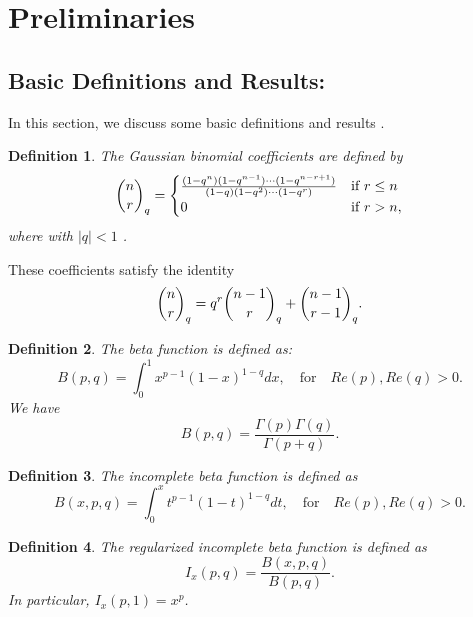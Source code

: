 \documentclass[12pt]{article}
\newtheorem{Def}{Definition}[section]
\numberwithin{equation}{section}
\begin{document}
\section{Preliminaries}\label{Pre}
\subsection{Basic Definitions and Results:}
In this section, we discuss some basic definitions and results \cite{ Magnus,Luchko, Kilbas, Podlubny, Samko, Kac}.
\begin{Def}\label{6.1.1}
The Gaussian binomial coefficients are defined by
\begin{equation}
\dbinom{n}{r}_q =
\begin{cases}
\frac{(1-q^n)(1-q^{n-1})\cdots(1-q^{n-r+1})}{(1-q)(1-q^2)\cdots(1-q^r)} & \text{if $r\le n$}\\
0 & \text{if $r > n$},
\end{cases}
\end{equation}
where  with $\mid q \mid < 1$ .
\end{Def}
These coefficients satisfy the identity
\begin{equation}
\dbinom{n}{r}_q = q^r \dbinom{n-1}{r}_q + \dbinom{n-1}{r-1}_q.\label{6.1.2}
\end{equation}

\begin{Def}
The beta function is defined as:
\begin{equation}
B(p,q) = \int_{0}^1 x^{p-1} (1-x)^{1-q}dx, \quad \textrm{for}\quad  Re(p), Re(q)>0.
\end{equation}
We have
\begin{equation}
B(p,q) =\frac{\Gamma (p) \Gamma (q)}{\Gamma{(p+q)}}.
\end{equation}
\end{Def}

\begin{Def}
The incomplete beta function is defined as
\begin{equation}
B(x,p,q) = \int_{0}^x t^{p-1} (1-t)^{1-q}dt, \quad \textrm{for}\quad  Re(p), Re(q)>0.
\end{equation}
\end{Def}

\begin{Def}
The regularized incomplete beta function is defined as
\begin{equation}
I_x(p,q) = \frac{B(x,p,q)}{B(p,q)}.
\end{equation}
In particular,  $I_x(p,1)=x^p$.
\end{Def}
\end{document}
